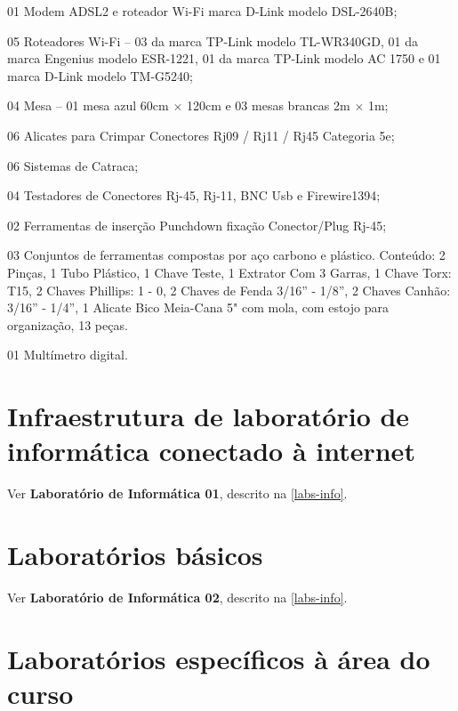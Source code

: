 \documentclass[
	12pt,				%
	openright,			%
	twoside,			%
	a4paper,			%
	chapter=TITLE,		%
	english,			%
	french,				%
	spanish,			%
	brazil,				%
	]{abntex2}
\begin{document}
\begin{alineas}
	\item 01 Modem ADSL2 e roteador Wi-Fi marca D-Link modelo DSL-2640B;
	\item 05 Roteadores Wi-Fi -- 03 da  marca TP-Link modelo TL-WR340GD, 01 da marca Engenius modelo ESR-1221, 01 da  marca TP-Link modelo AC 1750 e 01  marca D-Link modelo TM-G5240;
	\item 04 Mesa -- 01 mesa azul 60cm $\times$ 120cm e 03 mesas brancas 2m $\times$ 1m;
	\item 06 Alicates para Crimpar Conectores Rj09 / Rj11 / Rj45 Categoria 5e;
	\item 06 Sistemas de Catraca;
	\item 04 Testadores de Conectores Rj-45, Rj-11, BNC Usb e Firewire1394;
	\item 02 Ferramentas de inserção Punchdown fixação Conector/Plug Rj-45;
	\item 03 Conjuntos de ferramentas compostas por aço carbono e plástico.
Conteúdo: 2 Pinças, 1 Tubo Plástico, 1 Chave Teste, 1 Extrator Com
3 Garras, 1 Chave Torx: T15, 2 Chaves Phillips: 1 - 0, 2 Chaves de
Fenda 3/16'' - 1/8'', 2 Chaves Canhão: 3/16'' - 1/4'', 1 Alicate Bico
Meia-Cana 5" com mola, com estojo para organização, 13 peças.
	\item 01 Multímetro digital.

	
\end{alineas}

\section{Infraestrutura de laboratório de informática conectado à internet}

Ver \textbf{Laboratório de Informática 01}, descrito na \autoref{labs-info}.

\section{Laboratórios básicos}

Ver \textbf{Laboratório de Informática 02}, descrito na \autoref{labs-info}.


\section{Laboratórios específicos à área do curso}
\end{document}
